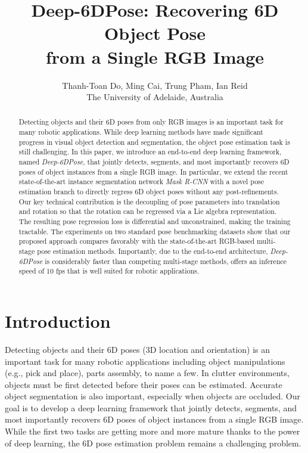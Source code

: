 \documentclass[conference]{IEEEtran}
\newcommand{\method}[1]{Deep-6DPose}
\begin{document}
\title{\method{}: Recovering 6D Object Pose \\from a Single RGB Image}
\author{Thanh-Toan Do, Ming Cai, Trung Pham, Ian Reid\\
The University of Adelaide, Australia}







\maketitle

\begin{abstract}
Detecting objects and their 6D poses from only RGB images is an important task for many robotic applications. While deep learning methods have made significant progress in visual object detection and segmentation, the object pose estimation task is still challenging. In this paper, we introduce an end-to-end deep learning framework, named \textit{\method{}}, that jointly detects, segments, and most importantly recovers 6D poses of object instances from a single RGB image. In particular, we extend the recent state-of-the-art instance segmentation network \emph{Mask R-CNN} with a novel pose estimation branch to directly regress 6D object poses without any post-refinements. Our key technical contribution is the decoupling of pose parameters into translation and rotation so that the rotation can be regressed via a Lie algebra representation. The resulting pose regression loss is differential and unconstrained, making the training tractable. The experiments on two standard pose benchmarking datasets show that our proposed approach compares favorably with the state-of-the-art RGB-based multi-stage pose estimation methods. Importantly, due to the end-to-end architecture, \textit{\method{}} is considerably faster than competing multi-stage methods, offers an inference speed of 10 fps that is well suited for robotic applications. %
 
\end{abstract}
\IEEEpeerreviewmaketitle


\section{Introduction}
Detecting objects and their 6D poses (3D location and orientation) is an important task for many robotic applications including object manipulations (e.g., pick and place), parts assembly, to name a few. In clutter environments, objects must be first detected before their poses can be estimated. Accurate object segmentation is also important, especially when objects are occluded. Our goal is to develop a deep learning framework that jointly detects, segments,  and most importantly recovers 6D poses of object instances from a single RGB image. While the first two tasks are getting more and more mature thanks to the power of deep learning, the 6D pose estimation problem remains a challenging problem.
\end{document}
